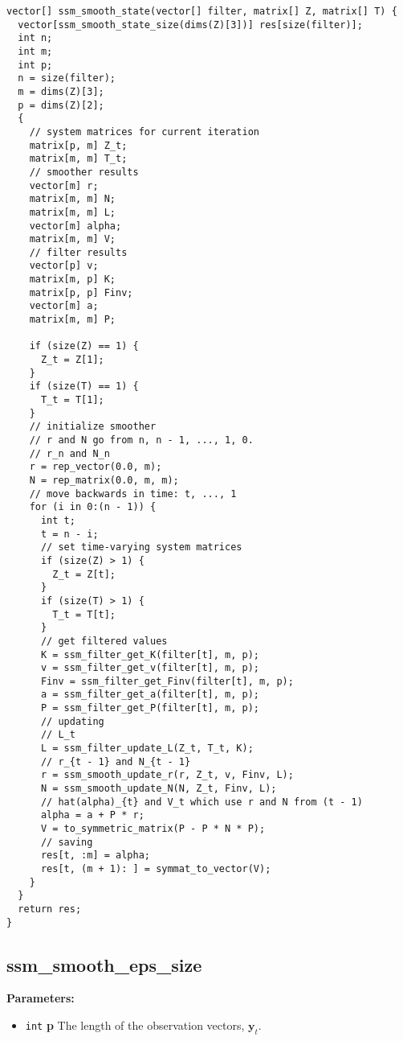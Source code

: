 \documentclass[]{book}
\providecommand{\tightlist}{%
  \setlength{\itemsep}{0pt}\setlength{\parskip}{0pt}}
\renewcommand{\vec}[1]{\boldsymbol{#1}}
\begin{document}
\begin{verbatim}
vector[] ssm_smooth_state(vector[] filter, matrix[] Z, matrix[] T) {
  vector[ssm_smooth_state_size(dims(Z)[3])] res[size(filter)];
  int n;
  int m;
  int p;
  n = size(filter);
  m = dims(Z)[3];
  p = dims(Z)[2];
  {
    // system matrices for current iteration
    matrix[p, m] Z_t;
    matrix[m, m] T_t;
    // smoother results
    vector[m] r;
    matrix[m, m] N;
    matrix[m, m] L;
    vector[m] alpha;
    matrix[m, m] V;
    // filter results
    vector[p] v;
    matrix[m, p] K;
    matrix[p, p] Finv;
    vector[m] a;
    matrix[m, m] P;

    if (size(Z) == 1) {
      Z_t = Z[1];
    }
    if (size(T) == 1) {
      T_t = T[1];
    }
    // initialize smoother
    // r and N go from n, n - 1, ..., 1, 0.
    // r_n and N_n
    r = rep_vector(0.0, m);
    N = rep_matrix(0.0, m, m);
    // move backwards in time: t, ..., 1
    for (i in 0:(n - 1)) {
      int t;
      t = n - i;
      // set time-varying system matrices
      if (size(Z) > 1) {
        Z_t = Z[t];
      }
      if (size(T) > 1) {
        T_t = T[t];
      }
      // get filtered values
      K = ssm_filter_get_K(filter[t], m, p);
      v = ssm_filter_get_v(filter[t], m, p);
      Finv = ssm_filter_get_Finv(filter[t], m, p);
      a = ssm_filter_get_a(filter[t], m, p);
      P = ssm_filter_get_P(filter[t], m, p);
      // updating
      // L_t
      L = ssm_filter_update_L(Z_t, T_t, K);
      // r_{t - 1} and N_{t - 1}
      r = ssm_smooth_update_r(r, Z_t, v, Finv, L);
      N = ssm_smooth_update_N(N, Z_t, Finv, L);
      // hat(alpha)_{t} and V_t which use r and N from (t - 1)
      alpha = a + P * r;
      V = to_symmetric_matrix(P - P * N * P);
      // saving
      res[t, :m] = alpha;
      res[t, (m + 1): ] = symmat_to_vector(V);
    }
  }
  return res;
}

\end{verbatim}

\subsection{ssm\_smooth\_eps\_size}\label{ssmux5fsmoothux5fepsux5fsize}

\textbf{Parameters:}

\begin{itemize}
\tightlist
\item
  \texttt{int} \textbf{p} The length of the observation vectors,
  \(\vec{y}_t\).
\end{itemize}
\end{document}
